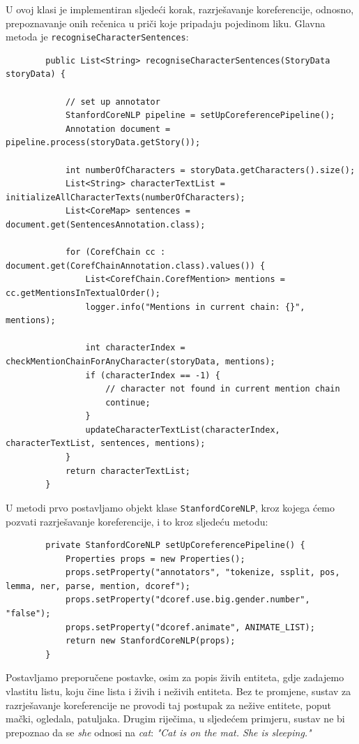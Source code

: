 \documentclass[a4paper,twoside,12pt]{memoir} %
\newcommand{\ti}[1]{\textit{#1\/}}
\begin{document}
		U ovoj klasi je implementiran sljedeći korak, razrješavanje koreferencije, odnosno, prepoznavanje onih rečenica u priči koje pripadaju pojedinom liku. Glavna metoda je \texttt{recogniseCharacterSentences}:

		\begin{lstlisting}
		public List<String> recogniseCharacterSentences(StoryData storyData) {

			// set up annotator
			StanfordCoreNLP pipeline = setUpCoreferencePipeline();
			Annotation document = pipeline.process(storyData.getStory());

			int numberOfCharacters = storyData.getCharacters().size();
			List<String> characterTextList = initializeAllCharacterTexts(numberOfCharacters);
			List<CoreMap> sentences = document.get(SentencesAnnotation.class);

			for (CorefChain cc : document.get(CorefChainAnnotation.class).values()) {
				List<CorefChain.CorefMention> mentions = cc.getMentionsInTextualOrder();
				logger.info("Mentions in current chain: {}", mentions);

				int characterIndex = checkMentionChainForAnyCharacter(storyData, mentions);
				if (characterIndex == -1) {
					// character not found in current mention chain
					continue;
				}
				updateCharacterTextList(characterIndex, characterTextList, sentences, mentions);
			}
			return characterTextList;
		}
		\end{lstlisting}

		U metodi prvo postavljamo objekt klase \texttt{StanfordCoreNLP}, kroz kojega ćemo pozvati razrješavanje koreferencije, i to kroz sljedeću metodu:

		\begin{lstlisting}
		private StanfordCoreNLP setUpCoreferencePipeline() {
			Properties props = new Properties();
			props.setProperty("annotators", "tokenize, ssplit, pos, lemma, ner, parse, mention, dcoref");
			props.setProperty("dcoref.use.big.gender.number", "false");
			props.setProperty("dcoref.animate", ANIMATE_LIST);
			return new StanfordCoreNLP(props);
		}
		\end{lstlisting}

		Postavljamo preporučene postavke, osim za popis živih entiteta, gdje zadajemo vlastitu listu, koju čine lista i živih i neživih entiteta. Bez te promjene, sustav za razrješavanje koreferencije ne provodi taj postupak za nežive entitete, poput mački, ogledala, patuljaka. Drugim riječima, u sljedećem primjeru, sustav ne bi prepoznao da se \ti{she} odnosi na \ti{cat}: \ti{"Cat is on the mat. She is sleeping."}
\end{document}
